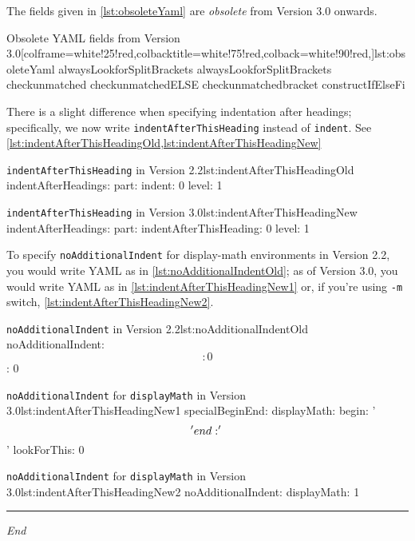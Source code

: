 	 The fields given in \cref{lst:obsoleteYaml} are \emph{obsolete} from Version 3.0
	 onwards.
	 \begin{yaml}[style=yaml-LST,numbers=none]{Obsolete YAML fields from Version 3.0}[colframe=white!25!red,colbacktitle=white!75!red,colback=white!90!red,]{lst:obsoleteYaml}
alwaysLookforSplitBrackets
alwaysLookforSplitBrackets
checkunmatched
checkunmatchedELSE
checkunmatchedbracket
constructIfElseFi
\end{yaml}

	 There is a slight difference when specifying indentation after headings; specifically,
	 we now write \texttt{indentAfterThisHeading} instead of \texttt{indent}. See \cref{lst:indentAfterThisHeadingOld,lst:indentAfterThisHeadingNew}

	 \begin{minipage}{.45\textwidth}
		 \begin{yaml}[style=yaml-LST,numbers=none]{\texttt{indentAfterThisHeading} in Version 2.2}{lst:indentAfterThisHeadingOld}
indentAfterHeadings:
    part:
       indent: 0
       level: 1
\end{yaml}
	 \end{minipage}%
	 \hfill
	 \begin{minipage}{.45\textwidth}
		 \begin{yaml}[style=yaml-LST,numbers=none]{\texttt{indentAfterThisHeading} in Version 3.0}{lst:indentAfterThisHeadingNew}
indentAfterHeadings:
    part:
       indentAfterThisHeading: 0
       level: 1
\end{yaml}
	 \end{minipage}%

	 To specify \texttt{noAdditionalIndent} for display-math environments in Version 2.2, you would write YAML
	 as in \cref{lst:noAdditionalIndentOld}; as of Version 3.0, you would write YAML as in \cref{lst:indentAfterThisHeadingNew1}
	 or, if you're using \texttt{-m} switch, \cref{lst:indentAfterThisHeadingNew2}.

	 \begin{minipage}{.45\textwidth}
		 \begin{yaml}[style=yaml-LST,numbers=none]{\texttt{noAdditionalIndent} in Version 2.2}{lst:noAdditionalIndentOld}
noAdditionalIndent:
    \[: 0
    \]: 0
\end{yaml}
	 \end{minipage}%
	 \hfill
	 \begin{minipage}{.45\textwidth}
		 \begin{yaml}[style=yaml-LST,numbers=none]{\texttt{noAdditionalIndent} for \texttt{displayMath} in Version 3.0}{lst:indentAfterThisHeadingNew1}
specialBeginEnd:
    displayMath:
        begin: '\\\['
        end: '\\\]'
        lookForThis: 0
\end{yaml}

		 \begin{yaml}[style=yaml-LST,numbers=none]{\texttt{noAdditionalIndent} for \texttt{displayMath}  in Version 3.0}{lst:indentAfterThisHeadingNew2}
noAdditionalIndent:
    displayMath: 1
\end{yaml}
	 \end{minipage}%

	 \mbox{}\hfill     \begin{minipage}{.25\textwidth}
		 \hrule

		 \hfill\itshape End

	 \end{minipage}
